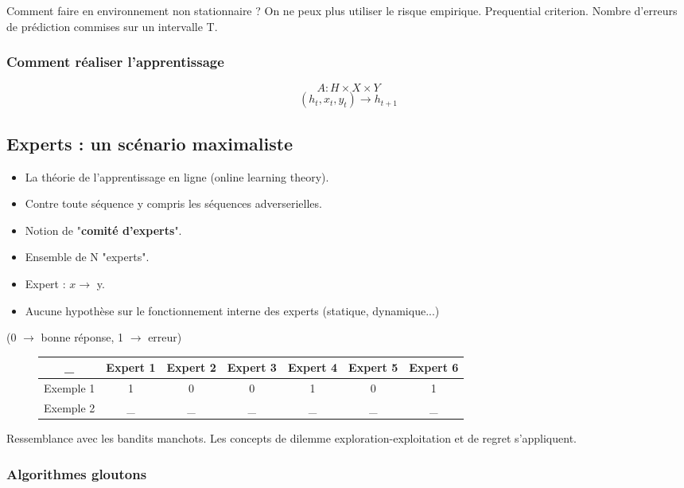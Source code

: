 \documentclass{article}
\begin{document}
Comment faire en environnement non stationnaire ? On ne peux plus utiliser le risque empirique. Prequential criterion. Nombre d'erreurs de prédiction commises sur un intervalle T.

\subsubsection*{Comment réaliser l'apprentissage}

\[ A : H \times X \times Y \]
\[ (h_t, x_t, y_t) \rightarrow h_{t+1} \]

\subsection{Experts : un scénario maximaliste}

\begin{itemize}
\item La théorie de l'apprentissage en ligne (online learning theory).
\item Contre toute séquence y compris les séquences adverserielles.
\item Notion de "\textbf{comité d'experts}".
\item Ensemble de N "experts".
\item Expert : $x \rightarrow$ y.
\item Aucune hypothèse sur le fonctionnement interne des experts (statique, dynamique...)
\end{itemize}

(0 $\rightarrow$ bonne réponse, 1 $\rightarrow$ erreur)

\begin{figure}[H]
\begin{tabular}{|c|c|c|c|c|c|c|}
    \hline
    \_ & Expert 1 & Expert 2 & Expert 3 & Expert 4 & Expert 5 & Expert 6 \\
    \hline
    Exemple 1 & 1 & 0 & 0 & 1 & 0 & 1 \\
    Exemple 2 & \_ & \_ & \_ & \_ & \_ & \_ \\
    \hline 
\end{tabular}
\end{figure}

Ressemblance avec les bandits manchots. Les concepts de dilemme exploration-exploitation et de regret s'appliquent.

\subsubsection{Algorithmes gloutons}
\end{document}
